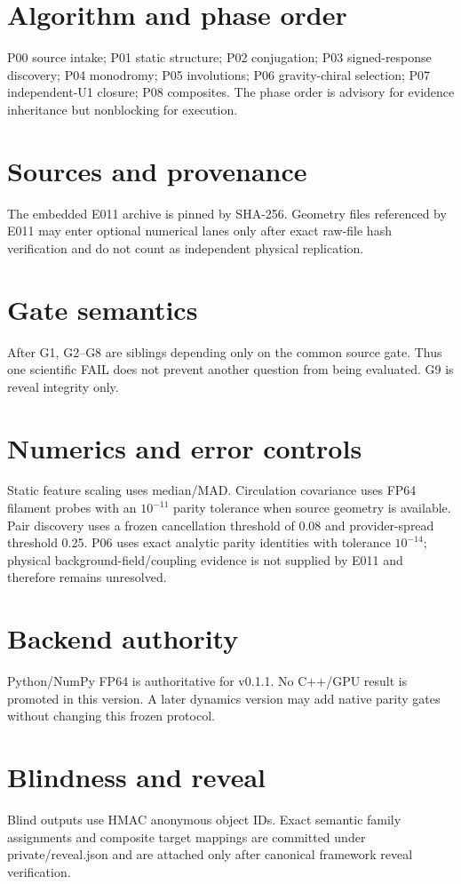 \documentclass[11pt]{article}
\begin{document}
\section{Algorithm and phase order}
P00 source intake; P01 static structure; P02 conjugation; P03 signed-response discovery; P04 monodromy; P05 involutions; P06 gravity-chiral selection; P07 independent-U1 closure; P08 composites. The phase order is advisory for evidence inheritance but nonblocking for execution.
\section{Sources and provenance}
The embedded E011 archive is pinned by SHA-256. Geometry files referenced by E011 may enter optional numerical lanes only after exact raw-file hash verification and do not count as independent physical replication.
\section{Gate semantics}
After G1, G2--G8 are siblings depending only on the common source gate. Thus one scientific FAIL does not prevent another question from being evaluated. G9 is reveal integrity only.
\section{Numerics and error controls}
Static feature scaling uses median/MAD. Circulation covariance uses FP64 filament probes with an $10^{-11}$ parity tolerance when source geometry is available. Pair discovery uses a frozen cancellation threshold of 0.08 and provider-spread threshold 0.25. P06 uses exact analytic parity identities with tolerance $10^{-14}$; physical background-field/coupling evidence is not supplied by E011 and therefore remains unresolved.
\section{Backend authority}
Python/NumPy FP64 is authoritative for v0.1.1. No C++/GPU result is promoted in this version. A later dynamics version may add native parity gates without changing this frozen protocol.
\section{Blindness and reveal}
Blind outputs use HMAC anonymous object IDs. Exact semantic family assignments and composite target mappings are committed under private/reveal.json and are attached only after canonical framework reveal verification.
\end{document}
